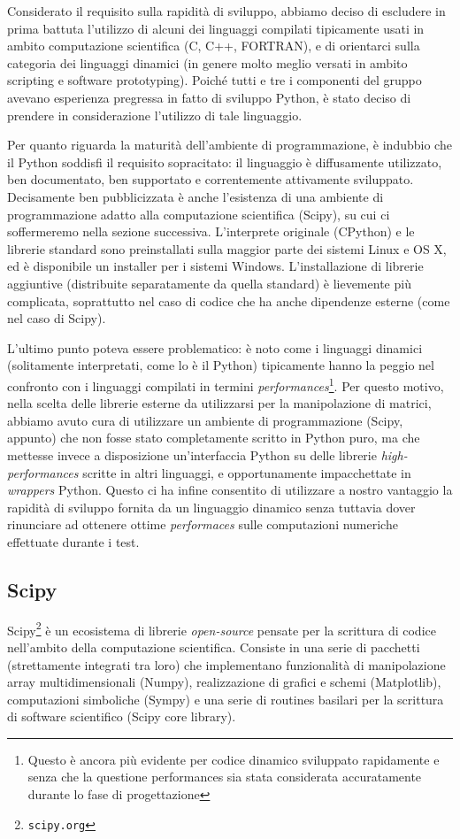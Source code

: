 \documentclass[11pt,a4paper]{scrartcl}
\begin{document}
Considerato il requisito sulla rapidità di sviluppo, abbiamo deciso di escludere in prima battuta l'utilizzo di alcuni dei linguaggi compilati tipicamente usati in ambito computazione scientifica (C, C++, FORTRAN), e di orientarci sulla categoria dei linguaggi dinamici (in genere molto meglio versati in ambito scripting e software prototyping). Poiché tutti e tre i componenti del gruppo avevano esperienza pregressa in fatto di sviluppo Python, è stato deciso di prendere in considerazione l'utilizzo di tale linguaggio.

Per quanto riguarda la maturità dell'ambiente di programmazione, è indubbio che il Python soddisfi il requisito sopracitato: il linguaggio è diffusamente utilizzato, ben documentato, ben supportato e correntemente attivamente sviluppato. Decisamente ben pubblicizzata è anche l'esistenza di una ambiente di programmazione adatto alla computazione scientifica (Scipy), su cui ci soffermeremo nella sezione successiva. L'interprete originale (CPython) e le librerie standard sono preinstallati sulla maggior parte dei sistemi Linux e OS X, ed è disponibile un installer per i sistemi Windows. L'installazione di librerie aggiuntive (distribuite separatamente da quella standard) è lievemente più complicata, soprattutto nel caso di codice che ha anche dipendenze esterne (come nel caso di Scipy).

L'ultimo punto poteva essere problematico: è noto come i linguaggi dinamici (solitamente interpretati, come lo è il Python) tipicamente hanno la peggio nel confronto con i linguaggi compilati in termini \emph{performances}\footnote{Questo è ancora più evidente per codice dinamico sviluppato rapidamente e senza che la questione performances sia stata considerata accuratamente durante lo fase di progettazione}. Per questo motivo, nella scelta delle librerie esterne da utilizzarsi per la manipolazione di matrici, abbiamo avuto cura di utilizzare un ambiente di programmazione (Scipy, appunto) che non fosse stato completamente scritto in Python puro, ma che mettesse invece a disposizione un'interfaccia Python su delle librerie \emph{high-performances} scritte in altri linguaggi, e opportunamente impacchettate in \emph{wrappers} Python. Questo ci ha infine consentito di utilizzare a nostro vantaggio la rapidità di sviluppo fornita da un linguaggio dinamico senza tuttavia dover rinunciare ad ottenere ottime \emph{performaces} sulle computazioni numeriche effettuate durante i test.


\subsection*{Scipy}
Scipy\footnote{\texttt{scipy.org}} è un ecosistema di librerie \emph{open-source} pensate per la scrittura di codice nell'ambito della computazione scientifica. Consiste in una serie di pacchetti (strettamente integrati tra loro) che implementano funzionalità di manipolazione array multidimensionali (Numpy), realizzazione di grafici e schemi (Matplotlib), computazioni simboliche (Sympy) e una serie di routines basilari per la scrittura di software scientifico (Scipy core library).
\end{document}
